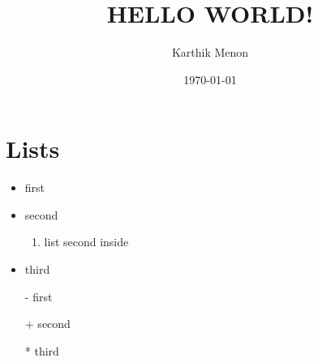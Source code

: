 \documentclass[a4paper,12pt]{article}
\begin{document}
\title{HELLO WORLD!}
\author{Karthik Menon}
\date{\today}
\maketitle
\newpage
\newpage
\section{Lists}
\begin{itemize}
	\item first
	\item second
	\begin{enumerate}
		\item list second inside
	\end{enumerate}
	\item third
\end{itemize}
\begin{itemize}
	\item[-] first
	\item[+] second
	\item[*] third
\end{itemize}
\end{document}

